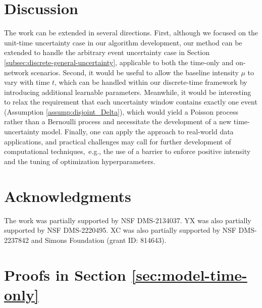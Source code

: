 \documentclass[11pt]{article}
\theoremstyle{remark}
\theoremstyle{plain}
\begin{document}
\section{Discussion}

The work can be extended in several directions. 
First, although we focused on the unit-time uncertainty case in our algorithm development, our method can be extended to handle the arbitrary event uncertainty case in Section \ref{subsec:discrete-general-uncertainty}, applicable to both the time-only and on-network scenarios.
Second, it would be useful to allow the baseline intensity $\mu$ to vary with time $t$, which can be handled within our discrete-time framework by introducing additional learnable parameters. 
Meanwhile, it would be interesting to relax the requirement that each uncertainty window contains exactly one event (Assumption \ref{assump:disjoint_Delta}), which would yield a Poisson process rather than a Bernoulli process and necessitate the development of a new time-uncertainty model. 
%
Finally, one can apply the approach to real-world data applications, and practical challenges may call for further development of computational techniques, e.g., the use of a barrier to enforce positive intensity and the tuning of optimization hyperparameters. 

\section*{Acknowledgments}
%
The work was partially supported by NSF DMS-2134037.
%
YX was also partially supported by 
NSF DMS-2220495.
%
XC was also partially supported by 
NSF DMS-2237842
and Simons Foundation (grant ID: 814643).

%
%




\appendix

\setcounter{figure}{0} \renewcommand{\thefigure}{A.\arabic{figure}}
\setcounter{table}{0} \renewcommand{\thetable}{A.\arabic{table}}

\setcounter{equation}{0} \renewcommand{\theequation}{A.\arabic{equation}}
\setcounter{remark}{0} \renewcommand{\theremark}{A.\arabic{remark}}



\clearpage

\section{Proofs in Section \ref{sec:model-time-only}}\label{app:proofs-sec:3}
\end{document}
